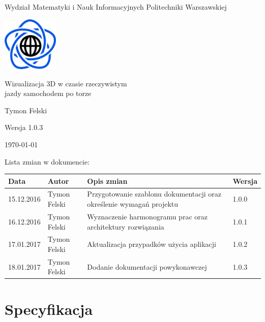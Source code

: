 \documentclass[10pt,a4paper]{article}
\begin{document}
\begin{titlepage}
	\centering
	{\Large Wydział Matematyki i Nauk Informacyjnych Politechniki Warszawskiej \par}
	\vspace{1cm}
	\includegraphics[width=0.2\textwidth]{Resources/Images/logo.png} \par
	\vspace{5cm}
	{\LARGE Wizualizacja 3D w czasie rzeczywistym\\jazdy samochodem po torze \par}
	\vspace{0.5cm}
	{\Large Tymon Felski \par}
	\vspace{1.5cm}
	{\Large Wersja 1.0.3 \par}
	\vspace{1.5cm}
	{\Large \today \par}
\end{titlepage}

\noindent
Lista zmian w dokumencie:
\begin{table}[H]
	\def\arraystretch{1.5}
	\begin{tabularx}{\textwidth}{|l|l|X|l|}
		\hline
		\textbf{Data} & \textbf{Autor} & \textbf{Opis zmian} & \textbf{Wersja} \\
		\hline
		15.12.2016 & Tymon Felski & Przygotowanie szablonu dokumentacji oraz określenie wymagań projektu & 1.0.0 \\
		\hline
		16.12.2016 & Tymon Felski & Wyznaczenie harmonogramu prac oraz architektury rozwiązania & 1.0.1 \\
		\hline
		17.01.2017 & Tymon Felski & Aktualizacja przypadków użycia aplikacji & 1.0.2 \\
		\hline
		18.01.2017 & Tymon Felski & Dodanie dokumentacji powykonawczej & 1.0.3 \\
		\hline
	\end{tabularx}
\end{table}

\newpage
\tableofcontents

\newpage
\section{Specyfikacja}
\end{document}
